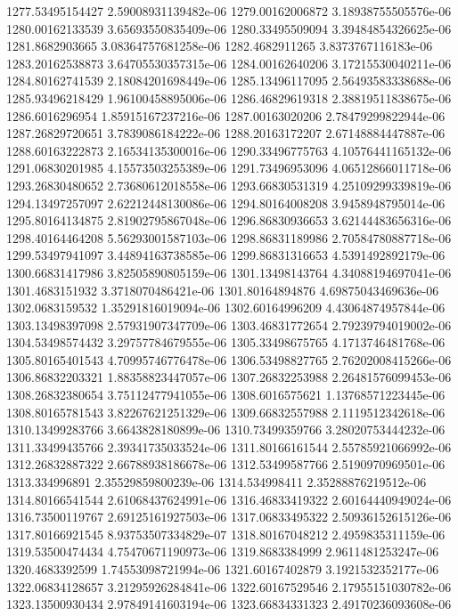 {1277.53495154427 2.59008931139482e-06
1279.00162006872 3.18938755505576e-06
1280.00162133539 3.65693550835409e-06
1280.33495509094 3.39484854326625e-06
1281.8682903665 3.08364757681258e-06
1282.4682911265 3.8373767116183e-06
1283.20162538873 3.64705530357315e-06
1284.00162640206 3.17215530040211e-06
1284.80162741539 2.18084201698449e-06
1285.13496117095 2.56493583338688e-06
1285.93496218429 1.96100458895006e-06
1286.46829619318 2.38819511838675e-06
1286.6016296954 1.85915167237216e-06
1287.00163020206 2.78479299822944e-06
1287.26829720651 3.7839086184222e-06
1288.20163172207 2.67148884447887e-06
1288.60163222873 2.16534135300016e-06
1290.33496775763 4.10576441165132e-06
1291.06830201985 4.15573503255389e-06
1291.73496953096 4.06512866011718e-06
1293.26830480652 2.73680612018558e-06
1293.66830531319 4.25109299339819e-06
1294.13497257097 2.62212448130086e-06
1294.80164008208 3.9458948795014e-06
1295.80164134875 2.81902795867048e-06
1296.86830936653 3.62144483656316e-06
1298.40164464208 5.56293001587103e-06
1298.86831189986 2.70584780887718e-06
1299.53497941097 3.44894163738585e-06
1299.86831316653 4.5391492892179e-06
1300.66831417986 3.82505890805159e-06
1301.13498143764 4.34088194697041e-06
1301.4683151932 3.3718070486421e-06
1301.80164894876 4.69875043469636e-06
1302.0683159532 1.35291816019094e-06
1302.60164996209 4.43064874957844e-06
1303.13498397098 2.57931907347709e-06
1303.46831772654 2.79239794019002e-06
1304.53498574432 3.29757784679555e-06
1305.33498675765 4.1713746481768e-06
1305.80165401543 4.70995746776478e-06
1306.53498827765 2.76202008415266e-06
1306.86832203321 1.88358823447057e-06
1307.26832253988 2.26481576099453e-06
1308.26832380654 3.75112477941055e-06
1308.6016575621 1.13768571223445e-06
1308.80165781543 3.82267621251329e-06
1309.66832557988 2.1119512342618e-06
1310.13499283766 3.6643828180899e-06
1310.73499359766 3.28020753444232e-06
1311.33499435766 2.39341735033524e-06
1311.80166161544 2.55785921066992e-06
1312.26832887322 2.66788938186678e-06
1312.53499587766 2.5190970969501e-06
1313.334996891 2.35529859800239e-06
1314.534998411 2.35288876219512e-06
1314.80166541544 2.61068437624991e-06
1316.46833419322 2.60164440949024e-06
1316.73500119767 2.69125161927503e-06
1317.06833495322 2.50936152615126e-06
1317.80166921545 8.93753507334829e-07
1318.80167048212 2.4959835311159e-06
1319.53500474434 4.75470671190973e-06
1319.8683384999 2.9611481253247e-06
1320.4683392599 1.74553098721994e-06
1321.60167402879 3.1921532352177e-06
1322.06834128657 3.21295926284841e-06
1322.60167529546 2.17955151030782e-06
1323.13500930434 2.97849141603194e-06
1323.66834331323 2.49170236093608e-06
}
